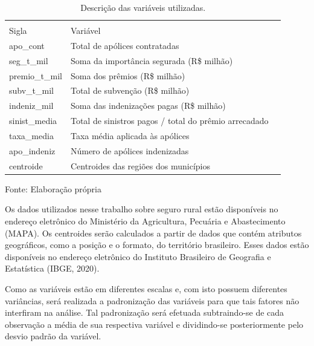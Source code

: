\documentclass[12pt, a4paper,brazil,oneside]{article}
\begin{document}
	
	\begin{table}[!htp]
		\caption{Descrição das variáveis utilizadas.} 
		\footnotesize
		\vspace{0.1cm}
		\label{variaveis}
		\begin{tabularx}{\textwidth}{lXX}
			\hline \\[-1.8ex]	 
			Sigla            & Variável                                              \\ \hline
			apo\_cont        & Total de apólices contratadas                         \\
			seg\_t\_mil      & Soma da importância segurada (R\$ milhão)             \\
			premio\_t\_mil   & Soma dos prêmios (R\$ milhão)                         \\
			subv\_t\_mil     & Total de subvenção (R\$ milhão)                       \\
			indeniz\_mil     & Soma das indenizações pagas (R\$ milhão)              \\
			sinist\_media    & Total de sinistros pagos / total do prêmio arrecadado \\ 
			taxa\_media      & Taxa média aplicada às apólices                       \\
			apo\_indeniz     & Número de apólices indenizadas                        \\ 
			centroide        & Centroides das regiões dos municípios                 \\ \hline
		\end{tabularx}
		\footnotesize{Fonte: Elaboração própria}
	\end{table}
	
	
	Os dados utilizados nesse trabalho sobre seguro rural estão disponíveis no endereço eletrônico do Ministério da Agricultura, Pecuária e Abastecimento (MAPA). Os centroides serão calculados a partir de dados que contém atributos geográficos, como a posição e o formato, do território brasileiro. Esses dados estão disponíveis no endereço eletrônico do Instituto Brasileiro de Geografia e Estatística (IBGE, 2020).
	
	Como as variáveis estão em diferentes escalas e, com isto possuem diferentes variâncias, será realizada a padronização das variáveis para que tais fatores não interfiram na análise. Tal padronização será	 efetuada subtraindo-se de cada observação a média de sua respectiva variável e dividindo-se posteriormente pelo desvio padrão da variável.
	
\end{document}
